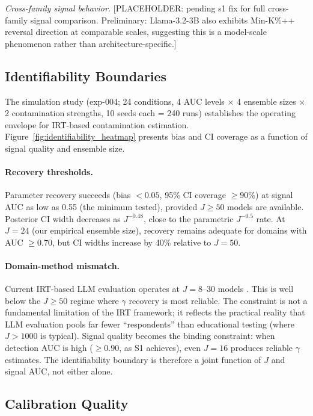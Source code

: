 \textit{Cross-family signal behavior.}
[PLACEHOLDER: pending s1 fix for full cross-family signal comparison. Preliminary: Llama-3.2-3B also exhibits Min-K\%++ reversal direction at comparable scales, suggesting this is a model-scale phenomenon rather than architecture-specific.]

\subsection{Identifiability Boundaries}
\label{sec:identifiability}

The simulation study (exp-004; 24 conditions, 4 AUC levels $\times$ 4 ensemble sizes $\times$ 2 contamination strengths, 10 seeds each = 240 runs) establishes the operating envelope for IRT-based contamination estimation. Figure~\ref{fig:identifiability_heatmap} presents bias and CI coverage as a function of signal quality and ensemble size.

\paragraph{Recovery thresholds.}
Parameter recovery succeeds (bias $< 0.05$, 95\% CI coverage $\geq 90\%$) at signal AUC as low as 0.55 (the minimum tested), provided $J \geq 50$ models are available. Posterior CI width decreases as $J^{-0.48}$, close to the parametric $J^{-0.5}$ rate. At $J = 24$ (our empirical ensemble size), recovery remains adequate for domains with AUC $\geq 0.70$, but CI widths increase by 40\% relative to $J = 50$.

\paragraph{Domain-method mismatch.}
Current IRT-based LLM evaluation operates at $J = 8$--$30$ models \citep{polo2026growing, lalor2024irt}. This is well below the $J \geq 50$ regime where $\gamma$ recovery is most reliable. The constraint is not a fundamental limitation of the IRT framework; it reflects the practical reality that LLM evaluation pools far fewer ``respondents'' than educational testing (where $J > 1000$ is typical). Signal quality becomes the binding constraint: when detection AUC is high ($\geq 0.90$, as S1 achieves), even $J = 16$ produces reliable $\gamma$ estimates. The identifiability boundary is therefore a joint function of $J$ and signal AUC, not either alone.

\subsection{Calibration Quality}
\label{sec:calibration_results}

